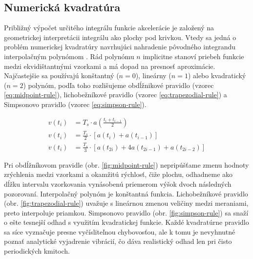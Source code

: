 \subsection{Numerická kvadratúra}
Približný výpočet určitého integrálu funkcie akcelerácie je založený na geometrickej interpretácii integrálu ako plochy pod krivkou.
Vtedy sa jedná o problém numerickej kvadratúry navrhujúci nahradenie pôvodného integrandu interpolačným polynómom
\cite{numerical-mathematics}. Rád polynómu $n$ implicitne stanoví priebeh funkcie medzi ekvidištantnými vzorkami a
má dopad na presnosť aproximácie. Najčastejšie sa používajú konštantný ($n = 0$), lineárny ($n = 1$) alebo kvadratický ($n = 2$)
polynóm, podľa toho rozlišujeme obdĺžnikové pravidlo (vzorec \ref{eq:midpoint-rule}),
lichobežníkové pravidlo (vzorec \ref{eq:trapezodial-rule}) a Simpsonovo pravidlo (vzorec \ref{eq:simpson-rule}).
\begin{ceqn}
\begin{align}
   v(t_i) &= T_s \cdot a\left(\frac{t_i + t_{i-1}}{2}\right)  \label{eq:midpoint-rule} \\
   v(t_i) &= \frac{T_s}{2} \cdot [a(t_i) + a(t_{i-1})]		\label{eq:trapezodial-rule} \\
   v(t_i) &= \frac{T_s}{3} \cdot [a(t_{2i}) + 4a(t_{2i - 1}) + a(t_{2i - 2})] \label{eq:simpson-rule}
\end{align}
\end{ceqn}

Pri obdĺžníkovom pravidle (obr. \ref{fig:midpoint-rule}) nepripúšťame zmenu hodnoty zrýchlenia medzi vzorkami a okamžitú
rýchlosť, čiže plochu, odhadneme ako dĺžku intervalu vzorkovania vynásobenú priemerom výšok dvoch následných pozorovaní. Interpolačný
polynóm je konštantná funkcia. Lichobežníkové pravidlo (obr. \ref{fig:trapezodial-rule}) uvažuje s lineárnou zmenou veličiny
medzi meraniami, preto interpoluje priamkou. Simpsonovo pravidlo (obr. \ref{fig:simpson-rule}) sa snaží o ešte tesnejší odhad s
využitím kvadratickej funkcie. Každé kvadratúrne pravidlo sa síce vyznačuje presne vyčísliteľnou chybovosťou, ale k tomu je nevyhnutné
poznať analytické vyjadrenie vibrácií, čo dáva realistický odhad len pri čisto periodických kmitoch.

